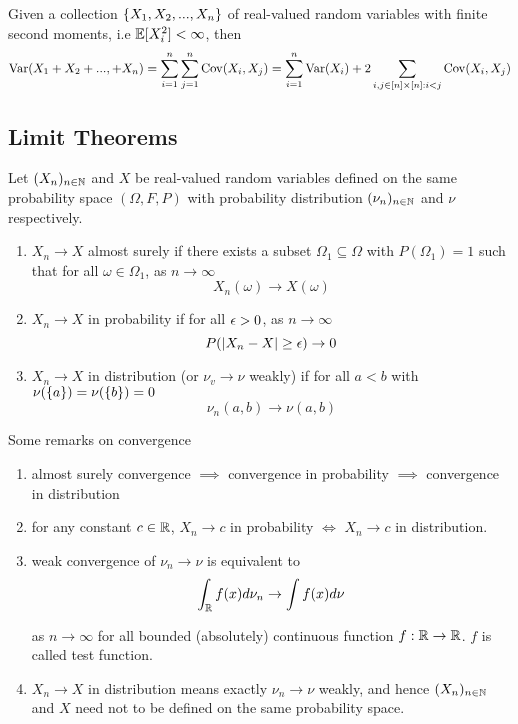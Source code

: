 \documentclass{report}
\begin{document}
\begin{proposition}
	Given a collection $\{X_1, X_2, ..., X_n\}$ of real-valued random variables with finite second moments, i.e $\mathbb{E}[X_i^2] < \infty$, then
	$$
		\operatorname{Var}(X_1 + X_2 + ..., + X_n) = \sum_{i=1}^n \sum_{j=1}^n \operatorname{Cov}(X_i, X_j) = \sum_{i=1}^n \operatorname{Var}(X_i) + 2 \sum_{i, j \in [n] \times [n]: i < j} \operatorname{Cov}(X_i, X_j)
	$$
\end{proposition}



\subsection{Limit Theorems}

\begin{definition}[convergence]
    Let $(X_n)_{n \in \mathbb{N}}$ and $X$ be real-valued random variables defined on the same probability space $(\Omega, F, P)$ with probability distribution $(\nu_n)_{n \in \mathbb{N}}$ and $\nu$ respectively.
    \begin{enumerate}
    	\item $X_n \to X$ almost surely if there exists a subset $\Omega_1 \subseteq \Omega$ with $P(\Omega_1) = 1$ such that for all $\omega \in \Omega_1$, as $n \to \infty$
    	$$
			X_n(\omega) \to X(\omega)
    	$$
    	
        \item $X_n \to X$ in probability if for all $\epsilon > 0$, as $n \to \infty$
        $$
			P(|X_n - X| \geq \epsilon) \to 0
        $$

        \item $X_n \to X$ in distribution (or $\nu_v \to \nu$ weakly) if for all $a < b$ with $\nu(\{a\}) = \nu(\{b\}) = 0$
        $$
			\nu_n(a, b) \to \nu(a, b)
        $$
    \end{enumerate}
\end{definition}

\begin{remark}
    Some remarks on convergence
    \begin{enumerate}
        \item almost surely convergence $\implies$ convergence in probability $\implies$ convergence in distribution

        \item for any constant $c \in \mathbb{R}$, $X_n \to c$ in probability $\iff$ $X_n \to c$ in distribution.

        \item weak convergence of $\nu_n \to \nu$ is equivalent to
        $$
			\int_{\mathbb{R}} f(x) d \nu_n \to \int f(x) d \nu
        $$
        
        as $n \to \infty$ for all bounded (absolutely) continuous function $f: \mathbb{R} \to \mathbb{R}$. $f$ is called test function.

        \item $X_n \to X$ in distribution means exactly $\nu_n \to \nu$ weakly, and hence $(X_n)_{n \in \mathbb{N}}$ and $X$ need not to be defined on the same probability space.
    \end{enumerate}
\end{remark}
\end{document}
